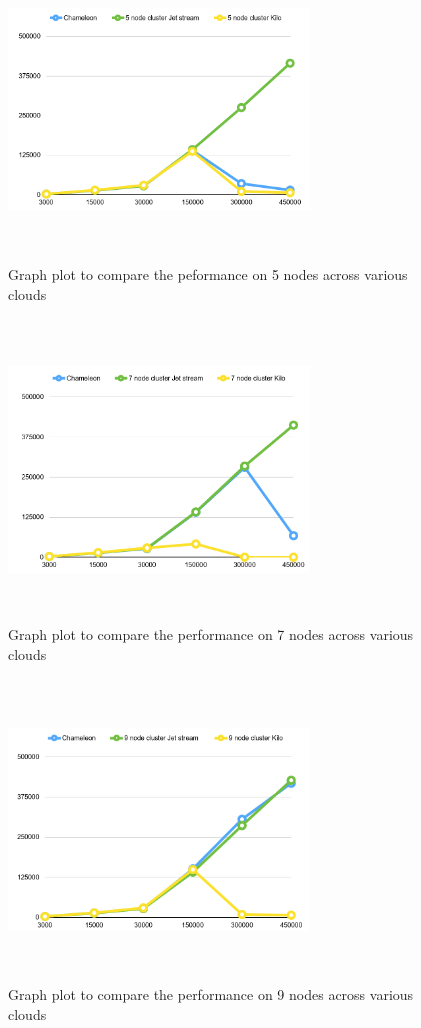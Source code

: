 \documentclass[9pt,twocolumn,twoside]{../../styles/osajnl}
\begin{document}
\begin{figure}[!htb]
  \includegraphics[width=8cm,height=8cm,keepaspectratio,width=\linewidth]{images/bench2-1.PNG}
  \caption{Graph plot to compare the peformance on 5 nodes across various clouds}
  \label{5c}
\end{figure}

\begin{figure}[!htb]
  \includegraphics[width=8cm,height=8cm,keepaspectratio,width=\linewidth]{images/bench2-2.PNG}
  \caption{Graph plot to compare the performance on 7 nodes across various clouds}
  \label{7c}
\end{figure}

\begin{figure}[!htb]
  \includegraphics[width=8cm,height=8cm,keepaspectratio,width=\linewidth]{images/bench2-3.PNG}
  \caption{Graph plot to compare the performance on 9 nodes across various clouds}
  \label{9c}
\end{figure}
\end{document}
